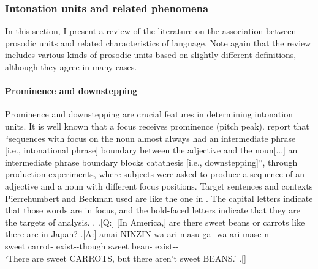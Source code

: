 

\subsubsection{Intonation units and related phenomena}

In this section,
I present a review of the literature on the association between prosodic units and related characteristics of language.
Note again that
the review includes various kinds of prosodic units
based on slightly different definitions,
although they agree in many cases.

\paragraph{Prominence and downstepping}

Prominence and downstepping are crucial features in determining intonation units.
It is well known that
a focus receives prominence (pitch peak).
 report that
``sequences with focus on the noun almost always had an intermediate phrase [i.e., intonational phrase] boundary between the adjective and the noun[...] an intermediate phrase boundary blocks catathesis [i.e., downstepping]'',
through production experiments,
where subjects were asked to produce a sequence of an adjective and a noun with different focus positions.
Target sentences and contexts Pierrehumbert and Beckman used are like the one in \Next.
The capital letters indicate that those words are in focus, and
the bold-faced letters indicate that they are the targets of analysis.
%
%
\ex.
 \a.[Q:] [In America,] are there sweet beans or carrots like there are in Japan?
 \bg.[A:] amai {NINZIN}-wa ari-masu-ga  -wa ari-mase-n \\
          sweet carrot- exist--though sweet bean- exist-- \\
      `There are sweet CARROTS, but there aren't sweet BEANS.'
 \b.[]   \hfill{\cite[59]{pierrehumbertbeckman88}}

